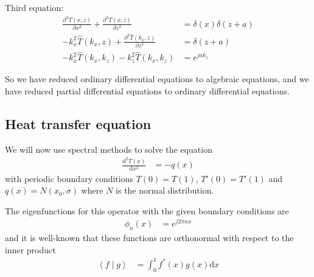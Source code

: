 \documentclass[twocolumn]{myarticle}
\renewcommand{\d}{\mathrm{d}}
\begin{document}
Third equation:
\begin{align}
    \frac{\partial^2 T(x, z)}{\partial x^2} + \frac{\partial^2 T(x,z)}{\partial z^2} &= \delta(x) \delta(z + a)
    \\
    - k_x^2 \hat{T}(k_x, z) + \frac{\partial^2 \hat{T}(k_x, z)}{\partial z^2} &= \delta(z + a)
    \\
    - k_x^2 \hat{T}(k_x, k_z) - k_z^2 \hat{T}(k_x, k_z) &= e^{jak_z}
\end{align}

So we have reduced ordinary differential equations to algebraic equations, and we have reduced partial differential equations to ordinary differential equations.



\subsection{Heat transfer equation}
\label{subsec:heat_transfer_equation}

We will now use spectral methods to solve the equation
\begin{align}
    \frac{\d^2 T(x)}{\d x^2} &= - q(x)
\end{align}
with periodic boundary conditions $ T(0) = T(1) $, $ T'(0) = T'(1) $ and $ q(x) = N(x_0, \sigma) $ where $ N $ is the normal distribution.

The eigenfunctions for this operator with the given boundary conditions are
\begin{align}
    \phi_n(x) &= e^{j 2 \pi n x}
\end{align}
and it is well-known that these functions are orthonormal with respect to the inner product
\begin{align}
    \left\langle f \middle| g \right\rangle &= \int_0^1 f^*(x) g(x) \d x
\end{align}
\end{document}
